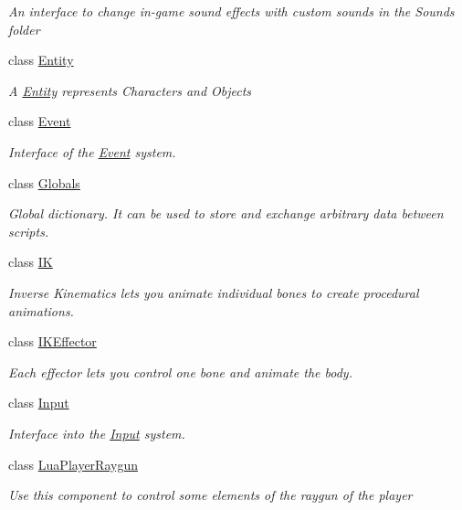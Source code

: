 \begin{DoxyCompactItemize}
\begin{DoxyCompactList}\small\item\em An interface to change in-\/game sound effects with custom sounds in the Sounds folder \end{DoxyCompactList}\item 
class \mbox{\hyperlink{class_lua_1_1_entity}{Entity}}
\begin{DoxyCompactList}\small\item\em A \mbox{\hyperlink{class_lua_1_1_entity}{Entity}} represents Characters and Objects \end{DoxyCompactList}\item 
class \mbox{\hyperlink{class_lua_1_1_event}{Event}}
\begin{DoxyCompactList}\small\item\em Interface of the \mbox{\hyperlink{class_lua_1_1_event}{Event}} system. \end{DoxyCompactList}\item 
class \mbox{\hyperlink{class_lua_1_1_globals}{Globals}}
\begin{DoxyCompactList}\small\item\em Global dictionary. It can be used to store and exchange arbitrary data between scripts. \end{DoxyCompactList}\item 
class \mbox{\hyperlink{class_lua_1_1_i_k}{IK}}
\begin{DoxyCompactList}\small\item\em Inverse Kinematics lets you animate individual bones to create procedural animations. \end{DoxyCompactList}\item 
class \mbox{\hyperlink{class_lua_1_1_i_k_effector}{I\+K\+Effector}}
\begin{DoxyCompactList}\small\item\em Each effector lets you control one bone and animate the body. \end{DoxyCompactList}\item 
class \mbox{\hyperlink{class_lua_1_1_input}{Input}}
\begin{DoxyCompactList}\small\item\em Interface into the \mbox{\hyperlink{class_lua_1_1_input}{Input}} system. \end{DoxyCompactList}\item 
class \mbox{\hyperlink{class_lua_1_1_lua_player_raygun}{Lua\+Player\+Raygun}}
\begin{DoxyCompactList}\small\item\em Use this component to control some elements of the raygun of the player \end{DoxyCompactList}\item 

\end{DoxyCompactItemize}
